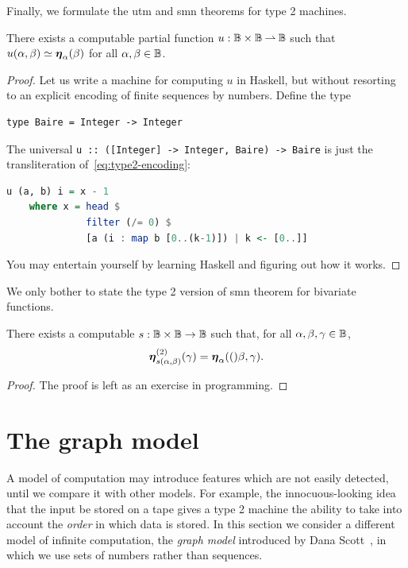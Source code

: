 Finally, we formulate the utm and smn theorems for type 2 machines.

\begin{theorem}
  There exists a computable partial function $u : \mathbb{B} \times
  \mathbb{B} \mathbin{\rightharpoonup} \mathbb{B}$ such that $u(\alpha, \beta) \simeq
  \text{\boldmath{$\eta$}}_{\alpha}(\beta)$ for all $\alpha, \beta \in \mathbb{B}$.
\end{theorem}

\begin{proof}
  Let us write a machine for computing $u$ in Haskell, but without
  resorting to an explicit encoding of finite sequences by numbers.
  Define the type
  \begin{lstlisting}
type Baire = Integer -> Integer
  \end{lstlisting}
  The universal \lstinline!u :: ([Integer] -> Integer, Baire) -> Baire! %
  is just the transliteration of~\eqref{eq:type2-encoding}:
  \begin{lstlisting}[language=Haskell]
u (a, b) i = x - 1
    where x = head $
              filter (/= 0) $
              [a (i : map b [0..(k-1)]) | k <- [0..]]
  \end{lstlisting}
  You may entertain yourself by learning Haskell and figuring out how
  it works.
\end{proof}

We only bother to state the type 2 version of smn theorem for
bivariate functions.

\begin{theorem}
  There exists a computable $s : \mathbb{B} \times \mathbb{B} \to \mathbb{B}$ such
  that, for all $\alpha, \beta, \gamma \in \mathbb{B}$,
  \begin{equation*}
    \text{\boldmath{$\eta$}}^{(2)}_{s(\alpha, \beta)}(\gamma) = \text{\boldmath{$\eta$}}_{\alpha}(()\beta, \gamma).
  \end{equation*}
\end{theorem}

\begin{proof}
  The proof is left as an exercise in programming.
\end{proof}


\section{The graph model}
\label{sec:graph-model}

A model of computation may introduce features which are not easily
detected, until we compare it with other models. For example, the
innocuous-looking idea that the input be stored on a tape gives a type
2 machine the ability to take into account the \emph{order} in which
data is stored. In this section we consider a different model of
infinite computation, the \emph{graph model} introduced by Dana
Scott~\cite{graph-model}, in which we use sets of numbers rather than
sequences.

